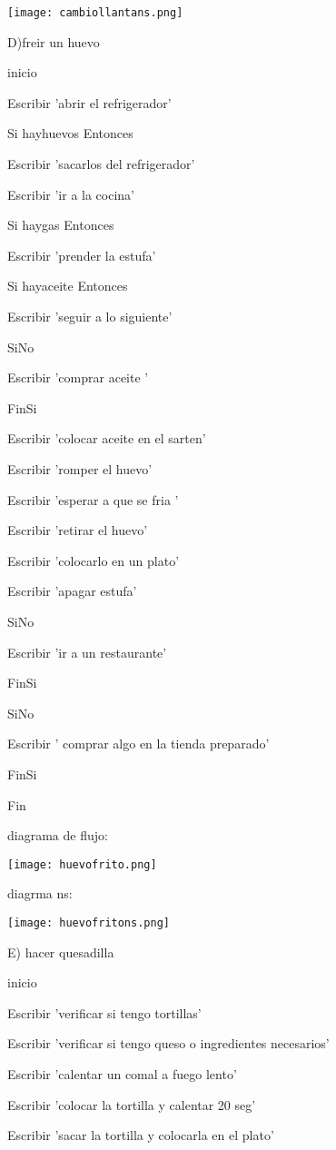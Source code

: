 \documentclass[10pt,a4paper]{article}
\begin{document}
\begin{multicols}{2}
\texttt{[image: cambiollantans.png]} 


D)freir un huevo 

inicio

Escribir 'abrir el refrigerador'

	Si hayhuevos Entonces

		Escribir 'sacarlos del refrigerador'

		Escribir 'ir a la cocina'

		Si haygas Entonces

			Escribir 'prender la estufa'

			Si hayaceite Entonces

				Escribir 'seguir a lo siguiente'

			SiNo

				Escribir 'comprar aceite '

			FinSi

			Escribir 'colocar aceite en el sarten'

			Escribir 'romper el huevo'

			Escribir 'esperar a que se fria '

			Escribir 'retirar el huevo'

			Escribir 'colocarlo en un plato'

			Escribir 'apagar estufa'

		SiNo

			Escribir 'ir a un restaurante'

		FinSi

	SiNo

		Escribir ' comprar algo en la tienda preparado'

	FinSi

Fin

diagrama de flujo:
 
\texttt{[image: huevofrito.png]}

diagrma ns: 

\texttt{[image: huevofritons.png]}  

E) hacer quesadilla 

inicio

Escribir 'verificar si tengo tortillas'

	Escribir 'verificar si tengo queso o ingredientes necesarios'

	Escribir 'calentar un comal a fuego lento'

	Escribir 'colocar la tortilla y calentar 20 seg'

	Escribir 'sacar la tortilla y colocarla en el plato'


\end{multicols}
\end{document}
